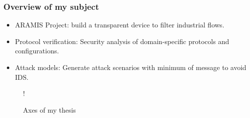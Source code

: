\documentclass{beamer}
\begin{document}
\begin{frame}
    \frametitle{Overview of my subject}
    
    \begin{itemize}
        \item ARAMIS Project: build a transparent device to filter industrial flows.
        \item Protocol verification: Security analysis of domain-specific protocols and configurations.
        \item {\color{red!90!black} Attack models: Generate attack scenarios with minimum of message to avoid IDS.}
    \end{itemize}

    \begin{figure}[htb]
        \centering
         {!} {
            
        }
        \caption{Axes of my thesis}
    \end{figure}
\end{frame}
\end{document}
